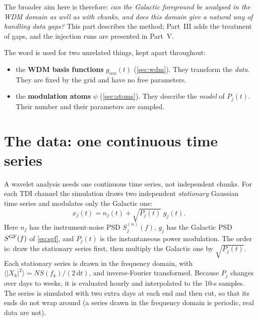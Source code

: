 \documentclass[11pt,a4paper]{article}
\newcommand{\dd}{\mathrm{d}}
\begin{document}
The broader aim here is therefore: \emph{can the Galactic foreground be analysed in
the WDM domain as well as with chunks, and does this domain give a natural way of
handling data gaps?} This part describes the method; Part~III adds the treatment of
gaps, and the injection runs are presented in Part~V.

\begin{keybox}
The word is used for two unrelated things, kept apart throughout:
\begin{itemize}
  \item the \textbf{WDM basis functions} $g_{nm}(t)$ (\cref{sec:wdm}). They transform
        the \emph{data}. They are fixed by the grid and have no free parameters.
  \item the \textbf{modulation atoms} $\psi$ (\cref{sec:atoms}). They describe the
        \emph{model} of $P_j(t)$. Their number and their parameters are sampled.
\end{itemize}
\end{keybox}

\section{The data: one continuous time series}\label{sec:wdata}

A wavelet analysis needs one continuous time series, not independent chunks. For each
TDI channel the simulation draws two independent \emph{stationary} Gaussian time
series and modulates only the Galactic one:
\begin{equation}
  x_j(t) = n_j(t) + \sqrt{P_j(t)}\; g_j(t).
  \label{eq:xt}
\end{equation}
Here $n_j$ has the instrument-noise PSD $S^{(n)}_j(f)$, $g_j$ has the Galactic PSD
$S^{\rm GF}(f)$ of \cref{eq:sgf}, and $P_j(t)$ is the instantaneous power modulation.
The order is: draw the stationary series first, then multiply the Galactic one by
$\sqrt{P_j(t)}$. Each stationary series is drawn in the frequency domain, with
$\langle|X_k|^2\rangle = N S(f_k)/(2\,\dd t)$, and inverse-Fourier transformed. Because
$P_j$ changes over days to weeks, it is evaluated hourly and interpolated to the
10-s samples. The series is simulated with two extra days at each end and then cut,
so that its ends do not wrap around (a series drawn in the frequency domain is
periodic, real data are not).
\end{document}
